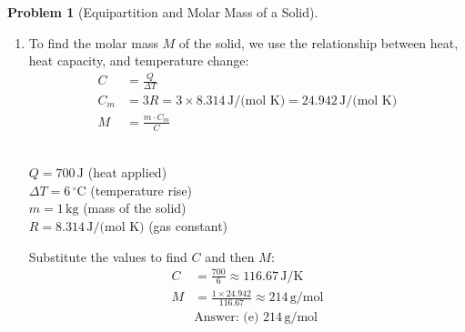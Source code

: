 \documentclass[12pt]{article}
\theoremstyle{definition} %
\newtheorem{problem}{Problem}
\theoremstyle{plain} %
\begin{document}
\begin{problem}[Equipartition and Molar Mass of a Solid]
    \noindent
    \begin{enumerate}
        \item 
        To find the molar mass \( M \) of the solid, we use the relationship between heat, heat capacity, and temperature change:
        \begin{align*}
        C &= \frac{Q}{\Delta T} \\
        C_m &= 3R = 3 \times 8.314 \, \text{J/(mol K)} = 24.942 \, \text{J/(mol K)} \\
        M &= \frac{m \cdot C_m}{C}
        \end{align*}
        
         \\
        \( Q = 700 \, \text{J} \) \quad (heat applied) \\
        \( \Delta T = 6 \, ^\circ \text{C} \) \quad (temperature rise) \\
        \( m = 1 \, \text{kg} \) \quad (mass of the solid) \\
        \( R = 8.314 \, \text{J/(mol K)} \) \quad (gas constant)

        Substitute the values to find \( C \) and then \( M \):
        \begin{align*}
        C &= \frac{700}{6} \approx 116.67 \, \text{J/K} \\
        M &= \frac{1 \times 24.942}{116.67} \approx 214 \, \text{g/mol} \\
        &\text{Answer: (e) } 214 \, \text{g/mol}
        \end{align*}
    \end{enumerate}
\end{problem}
\end{document}
